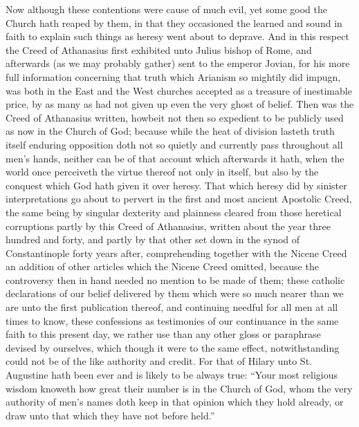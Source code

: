 Now although these contentions were cause of much evil, yet some good the Church hath reaped by them, in that they occasioned the learned and sound in faith to explain such things as heresy went about to deprave. And in this respect the Creed of Athanasius first exhibited unto Julius bishop of Rome, and afterwards (as we may probably gather) sent to the emperor Jovian, for his more full information concerning that truth which Arianism so mightily did impugn, was both in the East and the West churches accepted as a treasure of inestimable price, by as many as had not given up even the very ghost of belief. Then was the Creed of Athanasius written, howbeit not then so expedient to be publicly used as now in the Church of God; because while the heat of division lasteth truth itself enduring opposition doth not so quietly and currently pass throughout all men’s hands, neither can be of that account which afterwards it hath, when the world once perceiveth the virtue thereof not only in itself, but also by the conquest which God hath given it over heresy.
That which heresy did by sinister interpretations go about to pervert in the first and most ancient Apostolic Creed, the same being by singular dexterity and plainness cleared from those heretical corruptions partly by this Creed of Athanasius, written about the year three hundred and forty, and partly by that other set down in the synod of Constantinople forty years after, comprehending together with the Nicene Creed an addition of other articles which the Nicene  Creed omitted, because the controversy then in hand needed no mention to be made of them; these catholic declarations of our belief delivered by them which were so much nearer than we are unto the first publication thereof, and continuing needful for all men at all times to know, these confessions as testimonies of our continuance in the same faith to this present day, we rather use than any other gloss or paraphrase devised by ourselves, which though it were to the same effect, notwithstanding could not be of the like authority and credit. For that of Hilary unto St. Augustine hath been ever and is likely to be always true: “Your most religious wisdom knoweth how great their number is in the Church of God, whom the very authority of men’s names doth keep in that opinion which they hold already, or draw unto that which they have not before held.”
